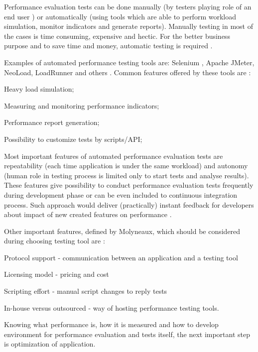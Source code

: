 \documentclass[12pt,a4paper]{article}
\let\tempone\itemize
\let\temptwo\enditemize
\renewenvironment{itemize}{\tempone\addtolength{\itemsep}{-0.4\baselineskip}}{\temptwo}
\begin{document}
Performance evaluation tests can be done manually (by testers playing role of an end user \cite{comparison}) or automatically (using tools which are able to perform workload simulation, monitor indicators and generate reports). Manually testing in most of the cases is time consuming, expensive and hectic. For the better business purpose and to save time and money, automatic testing is required \cite{automaiontools}.

Examples of automated performance testing tools are: Selenium \cite{automaiontools}, Apache JMeter, NeoLoad, LoadRunner and others \cite{analysisofpet}. Common features offered by these tools are \cite{analysisofpet}: 
\begin{itemize}
 \item Heavy load simulation;
 \item Measuring and monitoring performance indicators;
 \item Performance report generation;
 \item Possibility to customize tests by scripts/API;
\end{itemize}

Most important features of automated performance evaluation tests are repeatability (each time application is under the same workload) and autonomy (human role in testing process is limited only to start tests and analyse results). These features give possibility to conduct performance evaluation tests frequently during development phase or can be even included to continuous integration process. Such approach would deliver (practically) instant feedback for developers about impact of new created features on performance \cite{autobugs}. 

Other important features, defined by Molyneaux, which should be considered during choosing testing tool are \cite{artperformance}:
\begin{itemize}
 \item Protocol support - communication between an application and a testing tool
 \item Licensing model - pricing and cost
 \item Scripting effort - manual script changes to reply tests
 \item In-house versus outsourced - way of hosting performance testing tools.
\end{itemize}

Knowing what performance is, how it is measured and how to develop environment for performance evaluation and tests itself, the next important step is optimization of application. 
\end{document}
